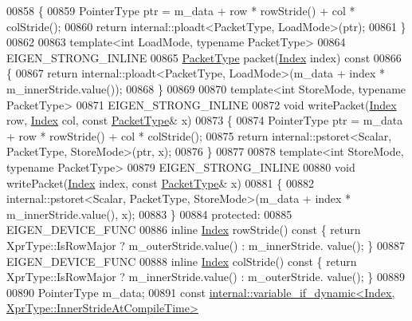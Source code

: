 \begin{DoxyCode}
00858 \textcolor{keyword}{  }\{
00859     PointerType ptr = m\_data + row * rowStride() + col * colStride();
00860     \textcolor{keywordflow}{return} internal::ploadt<PacketType, LoadMode>(ptr);
00861   \}
00862 
00863   \textcolor{keyword}{template}<\textcolor{keywordtype}{int} LoadMode, \textcolor{keyword}{typename} PacketType>
00864   EIGEN\_STRONG\_INLINE
00865   \hyperlink{struct_eigen_1_1_packet_type}{PacketType} packet(\hyperlink{namespace_eigen_a62e77e0933482dafde8fe197d9a2cfde}{Index} index)\textcolor{keyword}{ const}
00866 \textcolor{keyword}{  }\{
00867     \textcolor{keywordflow}{return} internal::ploadt<PacketType, LoadMode>(m\_data + index * m\_innerStride.value());
00868   \}
00869 
00870   \textcolor{keyword}{template}<\textcolor{keywordtype}{int} StoreMode, \textcolor{keyword}{typename} PacketType>
00871   EIGEN\_STRONG\_INLINE
00872   \textcolor{keywordtype}{void} writePacket(\hyperlink{namespace_eigen_a62e77e0933482dafde8fe197d9a2cfde}{Index} row, \hyperlink{namespace_eigen_a62e77e0933482dafde8fe197d9a2cfde}{Index} col, \textcolor{keyword}{const} \hyperlink{struct_eigen_1_1_packet_type}{PacketType}& x)
00873   \{
00874     PointerType ptr = m\_data + row * rowStride() + col * colStride();
00875     \textcolor{keywordflow}{return} internal::pstoret<Scalar, PacketType, StoreMode>(ptr, x);
00876   \}
00877 
00878   \textcolor{keyword}{template}<\textcolor{keywordtype}{int} StoreMode, \textcolor{keyword}{typename} PacketType>
00879   EIGEN\_STRONG\_INLINE
00880   \textcolor{keywordtype}{void} writePacket(\hyperlink{namespace_eigen_a62e77e0933482dafde8fe197d9a2cfde}{Index} index, \textcolor{keyword}{const} \hyperlink{struct_eigen_1_1_packet_type}{PacketType}& x)
00881   \{
00882     internal::pstoret<Scalar, PacketType, StoreMode>(m\_data + index * m\_innerStride.value(), x);
00883   \}
00884 \textcolor{keyword}{protected}:
00885   EIGEN\_DEVICE\_FUNC
00886   \textcolor{keyword}{inline} \hyperlink{namespace_eigen_a62e77e0933482dafde8fe197d9a2cfde}{Index} rowStride()\textcolor{keyword}{ const }\{ \textcolor{keywordflow}{return} XprType::IsRowMajor ? m\_outerStride.value() : m\_innerStride.
      value(); \}
00887   EIGEN\_DEVICE\_FUNC
00888   \textcolor{keyword}{inline} \hyperlink{namespace_eigen_a62e77e0933482dafde8fe197d9a2cfde}{Index} colStride()\textcolor{keyword}{ const }\{ \textcolor{keywordflow}{return} XprType::IsRowMajor ? m\_innerStride.value() : m\_outerStride.
      value(); \}
00889 
00890   PointerType m\_data;
00891   \textcolor{keyword}{const} \hyperlink{class_eigen_1_1internal_1_1variable__if__dynamic}{internal::variable\_if\_dynamic<Index, XprType::InnerStrideAtCompileTime>}

\end{DoxyCode}
